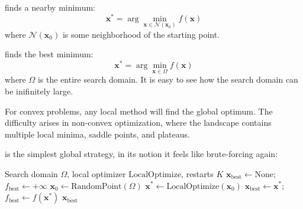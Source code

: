  finds a nearby minimum:
\begin{equation}
    \mathbf{x}^* = \arg\min_{\mathbf{x} \in \mathcal{N}(\mathbf{x}_0)} f(\mathbf{x})
\end{equation}
where $\mathcal{N}(\mathbf{x}_0)$ is some neighborhood of the starting point.


 finds the best minimum:
\begin{equation}
    \mathbf{x}^* = \arg\min_{\mathbf{x} \in \Omega} f(\mathbf{x})
\end{equation}
where $\Omega$ is the entire search domain. It is easy to see how the search domain can be inifinitely large. 


 For convex problems, any local method will find the global optimum. The difficulty arises in non-convex optimization, 
where the landscape contains multiple local minima, saddle points, and plateaus.


  

 is the simplest global strategy, in its notion it feels like brute-forcing again:

\begin{algorithm}[H]
\caption{Random Restarts}
\begin{algorithmic}[1]
    \Require Search domain $\Omega$, local optimizer $\text{LocalOptimize}$, restarts $K$
    \State $\mathbf{x}_{\text{best}} \gets \text{None}$; $f_{\text{best}} \gets +\infty$
        \State $\mathbf{x}_0 \gets \text{RandomPoint}(\Omega)$
        \State $\mathbf{x}^* \gets \text{LocalOptimize}(\mathbf{x}_0)$
            \State $\mathbf{x}_{\text{best}} \gets \mathbf{x}^*$; $f_{\text{best}} \gets f(\mathbf{x}^*)$
        \EndIf
    \EndFor
    \State \Return $\mathbf{x}_{\text{best}}$
\end{algorithmic}
\end{algorithm}

